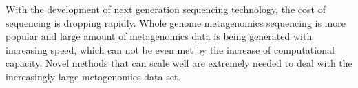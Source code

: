 With the development of next generation sequencing technology, the cost of sequencing is dropping rapidly. 
Whole genome metagenomics sequencing is more popular and large amount of metagenomics data is 
being generated with increasing speed, which can not be even met by the increase of computational capacity.
Novel methods that can scale well are extremely needed to deal with the increasingly large metagenomics data
set. 


